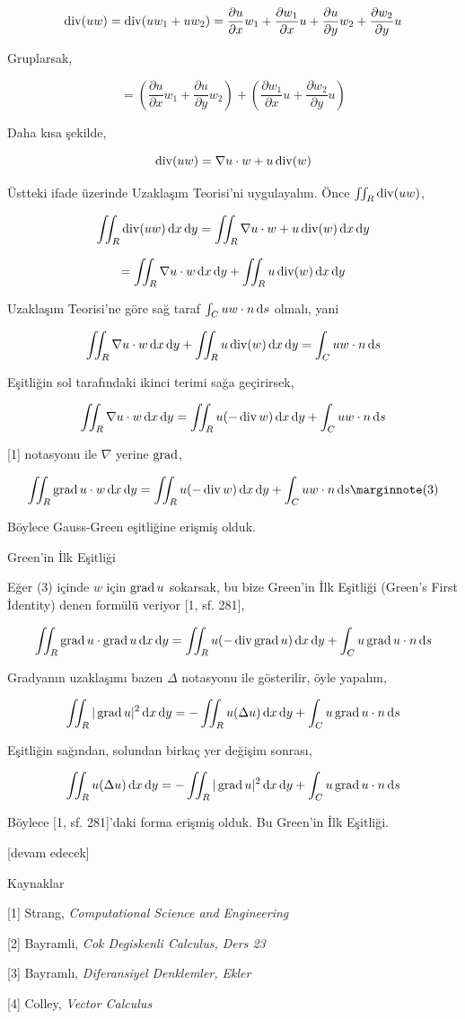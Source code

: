 \documentclass[12pt,fleqn]{article}\usepackage{../../common}
\begin{document}
$$
\operatorname{div} (uw) = \operatorname{div} (u w_1 + u w_2) =
\frac{\partial u}{\partial x} w_1 +
\frac{\partial w_1}{\partial x} u +
\frac{\partial u}{\partial y} w_2 +
\frac{\partial w_2}{\partial y} u 
$$

Gruplarsak,

$$
= \left( 
\frac{\partial u}{\partial x} w_1 +
\frac{\partial u}{\partial y} w_2 \right) +
\left( 
\frac{\partial w_1}{\partial x} u +
\frac{\partial w_2}{\partial y} u \right)
$$

Daha kısa şekilde,

$$
\operatorname{div} (uw) = \nabla u \cdot w + u \operatorname{div}(w)
$$

Üstteki ifade üzerinde Uzaklaşım Teorisi'ni uygulayalım. Önce
$\iint_R \operatorname{div} (uw)$,

$$
\iint_R \operatorname{div} (uw) \,\mathrm{d} x \,\mathrm{d} y= \iint_R \nabla u \cdot w + u \operatorname{div}(w) \,\mathrm{d} x \,\mathrm{d} y
$$

$$
= \iint_R \nabla u \cdot w  \,\mathrm{d} x \,\mathrm{d} y + \iint_R u \operatorname{div}(w) \,\mathrm{d} x \,\mathrm{d} y
$$

Uzaklaşım Teorisi'ne göre sağ taraf $\int_C uw \cdot n \,\mathrm{d} s$ olmalı, yani

$$
\iint_R \nabla u \cdot w  \,\mathrm{d} x \,\mathrm{d} y + \iint_R u \operatorname{div}(w) \,\mathrm{d} x \,\mathrm{d} y = \int_C uw \cdot n \,\mathrm{d} s
$$

Eşitliğin sol tarafındaki ikinci terimi sağa geçirirsek,

$$
\iint_R \nabla u \cdot w  \,\mathrm{d} x \,\mathrm{d} y =
\iint_R u (-\operatorname{div} w) \,\mathrm{d} x \,\mathrm{d} y + \int_C uw \cdot n \,\mathrm{d} s
$$

[1] notasyonu ile $\nabla$ yerine $\operatorname{grad}$,

$$
\iint_R \grad u \cdot w  \ud x \ud y =
\iint_R u (-\bdiv w) \ud x \ud y + \int_C uw \cdot n \ud s
\mlabel{3}
$$

Böylece Gauss-Green eşitliğine erişmiş olduk.

Green'in İlk Eşitliği 

Eğer (3) içinde $w$ için $\operatorname{grad} u$ sokarsak, bu bize Green'in İlk Eşitliği (Green's First
İdentity) denen formülü veriyor [1, sf. 281], 

$$
\iint_R \operatorname{grad} u \cdot \operatorname{grad} u  \,\mathrm{d} x \,\mathrm{d} y =
\iint_R u (-\operatorname{div} \operatorname{grad} u) \,\mathrm{d} x \,\mathrm{d} y + \int_C u \operatorname{grad} u \cdot n \,\mathrm{d} s
$$

Gradyanın uzaklaşımı bazen $\Delta$ notasyonu ile gösterilir, öyle yapalım,

$$
\iint_R | \operatorname{grad} u |^2  \,\mathrm{d} x \,\mathrm{d} y = - \iint_R u (\Delta u) \,\mathrm{d} x \,\mathrm{d} y +
\int_C u \operatorname{grad} u \cdot n \,\mathrm{d} s
$$

Eşitliğin sağından, solundan birkaç yer değişim sonrası,

$$
\iint_R u (\Delta u) \,\mathrm{d} x \,\mathrm{d} y =
- \iint_R | \operatorname{grad} u |^2  \,\mathrm{d} x \,\mathrm{d} y
+ \int_C u \operatorname{grad} u \cdot n \,\mathrm{d} s
$$

Böylece [1, sf. 281]'daki forma erişmiş olduk. Bu Green'in İlk Eşitliği.

[devam edecek]

Kaynaklar

[1] Strang, {\em Computational Science and Engineering}

[2] Bayramli, {\em Cok Degiskenli Calculus, Ders 23}

[3] Bayramlı, {\em Diferansiyel Denklemler, Ekler}

[4] Colley, {\em Vector Calculus}
\end{document}
